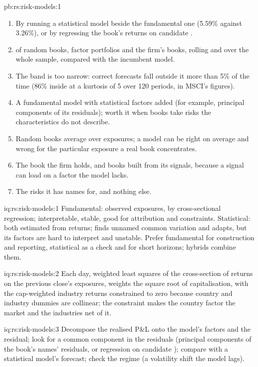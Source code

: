 \begin{solution}{pb:rs:risk-models:1}
\begin{enumerate}
\item By running a statistical model beside the fundamental one (5.59\% against 3.26\%), or by regressing the book's returns on candidate .
\item {} of random books, factor portfolios and the firm's books, rolling and over the whole sample, compared with the incumbent model.
\item The band is too narrow: correct forecasts fall outside it more than 5\% of the time (86\% inside at a kurtosis of 5 over 120 periods, in MSCI's figures).
\item A fundamental model with statistical factors added (for example, principal components of its residuals); worth it when books take risks the characteristics
do not describe.
\item Random books average over exposures; a model can be right on average and wrong for the particular exposure a real book concentrates.
\item The book the firm holds, and books built from its signals, because a signal can load on a factor the model lacks.
\item The risks it has names for, and nothing else.
\end{enumerate}
\end{solution}

\begin{solution}{iq:rs:risk-models:1}
Fundamental: observed exposures,  by cross-sectional regression; interpretable, stable, good for attribution and constraints. Statistical: both
estimated from returns; finds unnamed common variation and adapts, but its factors are hard to interpret and unstable. Prefer fundamental for construction and
reporting, statistical as a check and for short horizons; hybrids combine them.
\end{solution}

\begin{solution}{iq:rs:risk-models:2}
Each day, weighted least squares of the cross-section of returns on the previous close's exposures, weights the square root of capitalisation, with the
cap-weighted industry returns constrained to zero because country and industry dummies are collinear; the constraint makes the country factor the market and the
industries net of it.
\end{solution}

\begin{solution}{iq:rs:risk-models:3}
Decompose the realised P\&L onto the model's factors and the residual; look for a common component in the residuals (principal components of the book's names'
residuals, or regression on candidate ); compare with a statistical model's forecast; check the regime (a volatility shift the model lags).
\end{solution}

